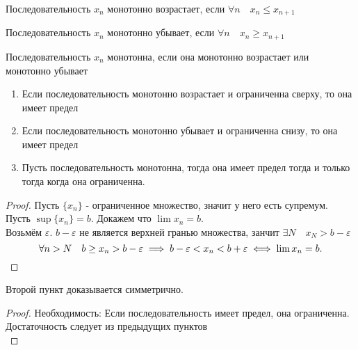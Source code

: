 \documentclass[11pt, oneside]{article}   	%
\begin{document}
\begin{definition}
    Последовательность $x_n$ монотонно возрастает, если $\forall{n}\quad x_n \le x_{n+1}$
\end{definition}
\begin{definition}
    Последовательность $x_n$ монотонно убывает, если $\forall{n}\quad x_n \ge x_{n+1}$
\end{definition}
\begin{definition}
    Последовательность $x_n$ монотонна, если она монотонно возрастает или монотонно убывает
\end{definition}
\begin{theorem}
    \begin{enumerate}
        \item Если последовательность монотонно возрастает и ограниченна сверху, то она имеет предел
        \item Если последовательность монотонно убывает и ограниченна снизу, то она имеет предел
        \item Пусть последовательность монотонна, тогда она имеет предел тогда и только тогда когда она ограниченна.
    \end{enumerate}
    \begin{proof}
        Пусть $\{x_n\} $ - ограниченное множество, значит у него есть супремум. Пусть  $\sup \{x_n\} = b$. Докажем что $\lim x_n = b$.\\
        Возьмём  $\varepsilon$. $b-\varepsilon$ не является верхней гранью множества, занчит $\exists{N}\quad x_N>b-\varepsilon$
        \[ \forall{n>N}\quad b\ge x_n>b-\varepsilon \implies b-\varepsilon < x_n < b+\varepsilon \iff \lim x_n = b .\qedhere\] 
    \end{proof}
    Второй пункт доказывается симметрично.
    \begin{proof}
        Необходимость: Если последовательность имеет предел, она ограниченна.\\
        Достаточность следует из предыдущих пунктов\\
    \end{proof}
\end{theorem}
\end{document}
